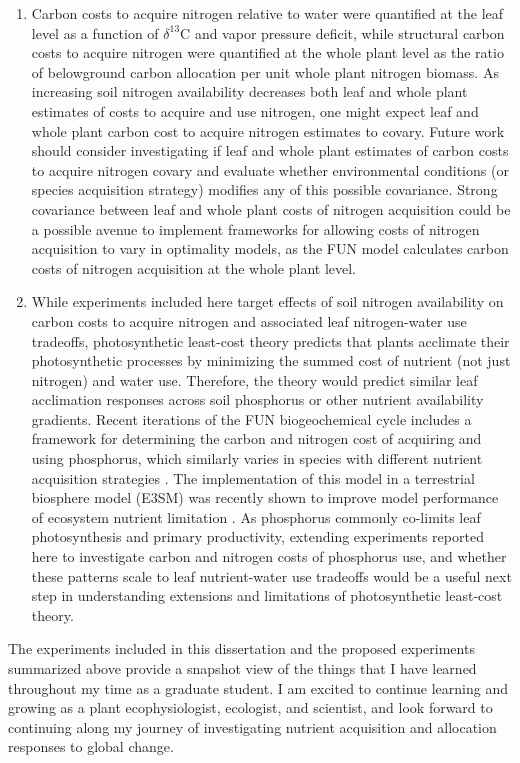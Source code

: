 \begin{enumerate}
    \item Carbon costs to acquire nitrogen relative to water were quantified at the leaf level as a function of $\delta^{13}$C and vapor pressure deficit, while structural carbon costs to acquire nitrogen were quantified at the whole plant level as the ratio of belowground carbon allocation per unit whole plant nitrogen biomass. As increasing soil nitrogen availability decreases both leaf and whole plant estimates of costs to acquire and use nitrogen, one might expect leaf and whole plant carbon cost to acquire nitrogen estimates to covary. Future work should consider investigating if leaf and whole plant estimates of carbon costs to acquire nitrogen covary and evaluate whether environmental conditions (or species acquisition strategy) modifies any of this possible covariance. Strong covariance between leaf and whole plant costs of nitrogen acquisition could be a possible avenue to implement frameworks for allowing costs of nitrogen acquisition to vary in optimality models, as the FUN model calculates carbon costs of nitrogen acquisition at the whole plant level.
    
    \item While experiments included here target effects of soil nitrogen availability on carbon costs to acquire nitrogen and associated leaf nitrogen-water use tradeoffs, photosynthetic least-cost theory predicts that plants acclimate their photosynthetic processes by minimizing the summed cost of nutrient (not just nitrogen) and water use. Therefore, the theory would predict similar leaf acclimation responses across soil phosphorus or other nutrient availability gradients. Recent iterations of the FUN biogeochemical cycle includes a framework for determining the carbon and nitrogen cost of acquiring and using phosphorus, which similarly varies in species with different nutrient acquisition strategies . The implementation of this model in a terrestrial biosphere model (E3SM) was recently shown to improve model performance of ecosystem nutrient limitation . As phosphorus commonly co-limits leaf photosynthesis and primary productivity, extending experiments reported here to investigate carbon and nitrogen costs of phosphorus use, and whether these patterns scale to leaf nutrient-water use tradeoffs would be a useful next step in understanding extensions and limitations of photosynthetic least-cost theory.
\end{enumerate}

\noindent The experiments included in this dissertation and the proposed experiments summarized above provide a snapshot view of the things that I have learned throughout my time as a graduate student. I am excited to continue learning and growing as a plant ecophysiologist, ecologist, and scientist, and look forward to continuing along my journey of investigating nutrient acquisition and allocation responses to global change.